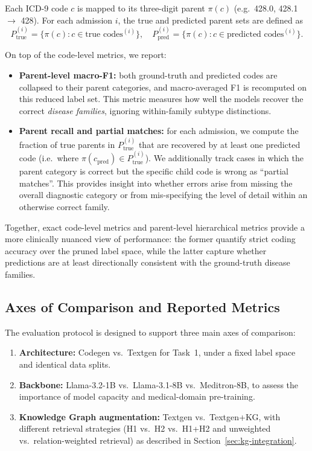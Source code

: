 Each ICD-9 code $c$ is mapped to its three-digit parent $\pi(c)$ (e.g.\ 428.0, 428.1 $\rightarrow$ 428). For each admission $i$, the true and predicted parent sets are defined as
\[
    P_{\text{true}}^{(i)} = \{\pi(c) : c \in \text{true codes}^{(i)}\}, \quad
    P_{\text{pred}}^{(i)} = \{\pi(c) : c \in \text{predicted codes}^{(i)}\}.
\]

On top of the code-level metrics, we report:

\begin{itemize}
    \item \textbf{Parent-level macro-F1:} both ground-truth and predicted codes are collapsed to their parent categories, and macro-averaged F1 is recomputed on this reduced label set. This metric measures how well the models recover the correct \emph{disease families}, ignoring within-family subtype distinctions.
    \item \textbf{Parent recall and partial matches:} for each admission, we compute the fraction of true parents in $P_{\text{true}}^{(i)}$ that are recovered by at least one predicted code (i.e.\ where $\pi(c_{\text{pred}}) \in P_{\text{true}}^{(i)}$). We additionally track cases in which the parent category is correct but the specific child code is wrong as ``partial matches''. This provides insight into whether errors arise from missing the overall diagnostic category or from mis-specifying the level of detail within an otherwise correct family.
\end{itemize}

Together, exact code-level metrics and parent-level hierarchical metrics provide a more clinically nuanced view of performance: the former quantify strict coding accuracy over the pruned label space, while the latter capture whether predictions are at least directionally consistent with the ground-truth disease families.

\subsection{Axes of Comparison and Reported Metrics}
\label{subsec:model-comparisons}

The evaluation protocol is designed to support three main axes of comparison:

\begin{enumerate}
    \item \textbf{Architecture:} Codegen vs.\ Textgen for Task~1, under a fixed label space and identical data splits.
    \item \textbf{Backbone:} Llama-3.2-1B vs.\ Llama-3.1-8B vs.\ Meditron-8B, to assess the importance of model capacity and medical-domain pre-training.
    \item \textbf{Knowledge Graph augmentation:} Textgen vs.\ Textgen+KG, with different retrieval strategies (H1 vs.\ H2 vs.\ H1+H2 and unweighted vs.\ relation-weighted retrieval) as described in Section~\ref{sec:kg-integration}.
\end{enumerate}

